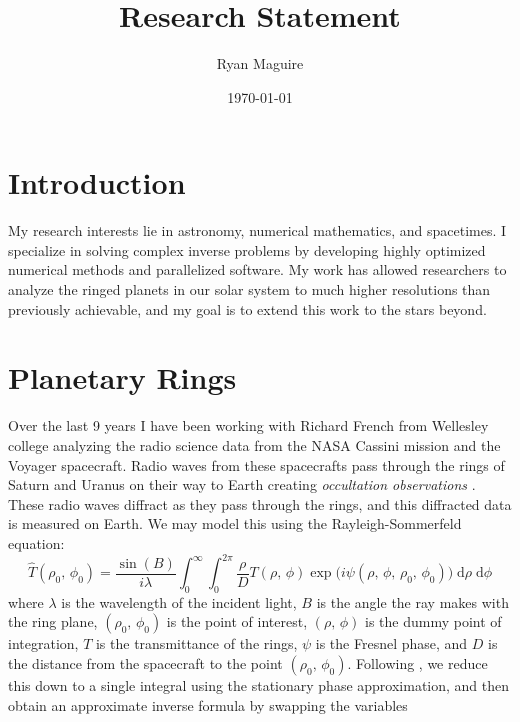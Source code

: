 \documentclass{article}
\title{Research Statement}
\author{Ryan Maguire}
\date{\today}
\begin{document}
    \maketitle
    \section{Introduction}
        My research interests lie in astronomy, numerical mathematics,
        and spacetimes.
        I specialize in solving complex inverse problems by developing
        highly optimized numerical methods and parallelized software.
        My work has allowed researchers to analyze the ringed planets in our
        solar system to much higher resolutions than previously achievable,
        and my goal is to extend this work to the stars beyond.
    \section{Planetary Rings}
        Over the last 9 years I have been working with Richard French from
        Wellesley college analyzing the radio science data from the NASA
        Cassini mission and the Voyager spacecraft. Radio waves from these
        spacecrafts pass through the rings of Saturn and Uranus on their way
        to Earth creating \textit{occultation observations}
        \cite{Marouf1982TheoryOR}. These radio waves diffract as they pass
        through the rings, and this diffracted data is measured on Earth. We
        may model this using the Rayleigh-Sommerfeld equation:
        \begin{equation}
            \hat{T}(\rho_{0},\,\phi_{0})
            =
            \frac{\sin(B)}{i\lambda}
            \int_{0}^{\infty}
                \int_{0}^{2\pi}
                    \frac{\rho}{D}
                    T(\rho,\,\phi)
                    \exp\big(i\psi(\rho,\,\phi,\,\rho_{0},\,\phi_{0})\big)\;
                \textrm{d}\rho\;
                \textrm{d}\phi
        \end{equation}
        where $\lambda$ is the wavelength of the incident light, $B$ is
        the angle the ray makes with the ring plane, $(\rho_{0},\,\phi_{0})$
        is the point of interest, $(\rho,\,\phi)$ is the dummy point of
        integration, $T$ is the transmittance of the rings, $\psi$ is
        the Fresnel phase, and $D$ is the distance from the spacecraft to
        the point $(\rho_{0},\,\phi_{0})$. Following \cite{MTR86}, we reduce
        this down to a single integral using the stationary phase approximation,
        and then obtain an approximate inverse formula by swapping the variables
\end{document}
